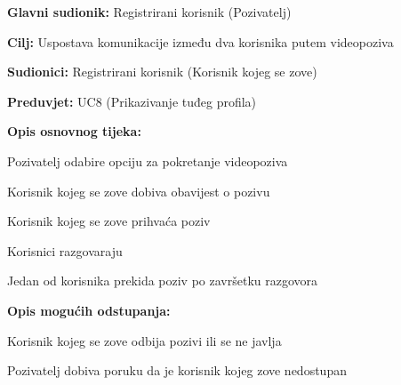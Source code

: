 					\noindent {}
					\begin{packed_item}
						\item \textbf{Glavni sudionik: }Registrirani korisnik (Pozivatelj)
						\item \textbf{Cilj: }Uspostava komunikacije između dva korisnika putem videopoziva
						\item \textbf{Sudionici: }Registrirani korisnik (Korisnik kojeg se zove)
						\item \textbf{Preduvjet: }UC8 (Prikazivanje tuđeg profila)
						\item \textbf{Opis osnovnog tijeka:}
						
						\item[] \begin{packed_enum}
							\item Pozivatelj odabire opciju za pokretanje videopoziva
							\item Korisnik kojeg se zove dobiva obavijest o pozivu
							\item Korisnik kojeg se zove prihvaća poziv
							\item Korisnici razgovaraju
							\item Jedan od korisnika prekida poziv po završetku razgovora
						\end{packed_enum}
						\item \textbf{Opis mogućih odstupanja:}
						\item[] \begin{packed_enum}
							\item[3.a] Korisnik kojeg se zove odbija pozivi ili se ne javlja
							\begin{packed_enum}
								\item[1.] Pozivatelj dobiva poruku da je korisnik kojeg zove nedostupan
							\end{packed_enum}
						\end{packed_enum}
					\end{packed_item}
					
